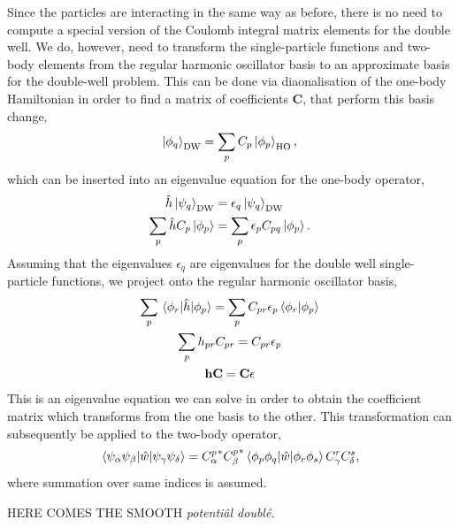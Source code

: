 Since the particles are interacting in the same way as before, there is no need 
to compute a special version of the Coulomb integral matrix elements for the 
double well. We do, however, need to transform the single-particle functions and 
two-body elements from the regular harmonic oscillator basis to an approximate basis 
for the double-well problem. This can be done via diaonalisation of the one-body 
Hamiltonian in order to find a matrix of coefficients $\mathbf{C}$, that perform 
this basis change,
\begin{equation}
    \ket{\phi_q}_\text{DW} = \sum_p C_p \ket{\phi_p}_\text{HO},
\end{equation}
which can be inserted into an eigenvalue equation for the one-body operator,
\begin{equation}
    \begin{aligned}
        \hat{h} \ket{\psi_q}_\text{DW} &= \epsilon_q\ket{\psi_q}_\text{DW} \\
        \sum_p \hat{h}C_p \ket{\phi_p} &= \sum_p\epsilon_p C_{pq}\ket{\phi_p}.
    \end{aligned}
\end{equation}
Assuming that the eigenvalues $\epsilon_q$ are eigenvalues for the double well 
single-particle functions, we project onto the regular harmonic oscillator 
basis,
\begin{equation}
    \begin{gathered}
     \sum_p\mel{\phi_r}{\hat{h}}{\phi_p} 
        = \sum_p C_{pr} \epsilon_p \braket{\phi_r}{\phi_p} \\
    \sum_p h_{pr} C_{pr} = C_{pr}\epsilon_p \\
    \mathbf{h} \mathbf{C} = \mathbf{C} \mathbf{\epsilon}
    \end{gathered}
\end{equation}
This is an eigenvalue equation we can solve in order to obtain the coefficient 
matrix which transforms from the one basis to the other. This transformation
can subsequently be applied to the two-body operator,
\begin{equation}
    \mel{\psi_\alpha\psi_\beta}{\hat{w}}{\psi_\gamma\psi_\delta} 
    = {C^p_\alpha}^* {C^p_\beta}^* \mel{\phi_p\phi_q}{\hat{w}}{\phi_r\phi_s} C^r_\gamma C^s_\delta,
\end{equation}
where summation over same indices is assumed.



HERE COMES THE SMOOTH \emph{potentiâl doublé}.

